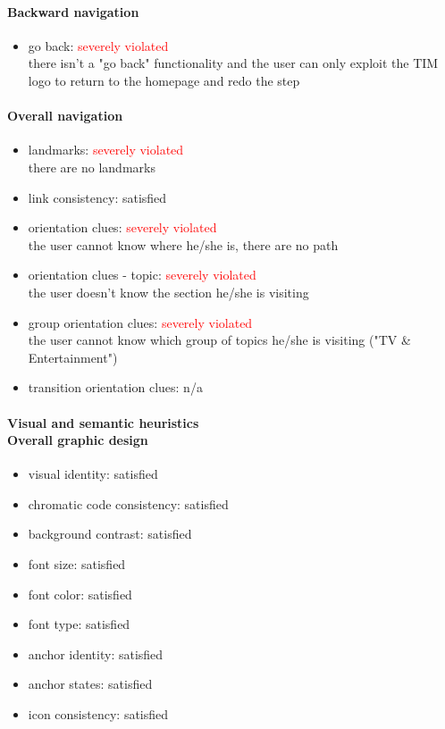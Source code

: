 \begin{enumerate}
	\paragraph*{Backward navigation}
	\begin{itemize}
		\item go back: \textcolor {red}{severely violated}\\
		there isn't a "go back" functionality and the user can only exploit the TIM logo to return to the homepage and redo the step
	\end{itemize}
	
	\paragraph*{Overall navigation}
	\begin{itemize}
		\item landmarks: \textcolor {red}{severely violated}\\
		there are no landmarks
		\item link consistency: satisfied
		\item orientation clues: \textcolor {red}{severely violated}\\
		the user cannot know where he/she is, there are no path
		\item orientation clues - topic: \textcolor{red}{severely violated}\\
		the user doesn't know the section he/she is visiting
		\item group orientation clues: \textcolor{red}{severely violated}\\
		the user cannot know which group of topics he/she is visiting ("TV \& Entertainment")
		\item transition orientation clues: n/a
	\end{itemize}	
	
	\paragraph*{Visual and semantic heuristics \\ Overall graphic design }
	\begin{itemize}
		\item visual identity: satisfied
		\item chromatic code consistency: satisfied
		\item background contrast: satisfied
		\item font size: satisfied
		\item font color: satisfied
		\item font type: satisfied
		\item anchor identity: satisfied
		\item anchor states: satisfied
		\item icon consistency: satisfied
	\end{itemize}
	

\end{enumerate}
